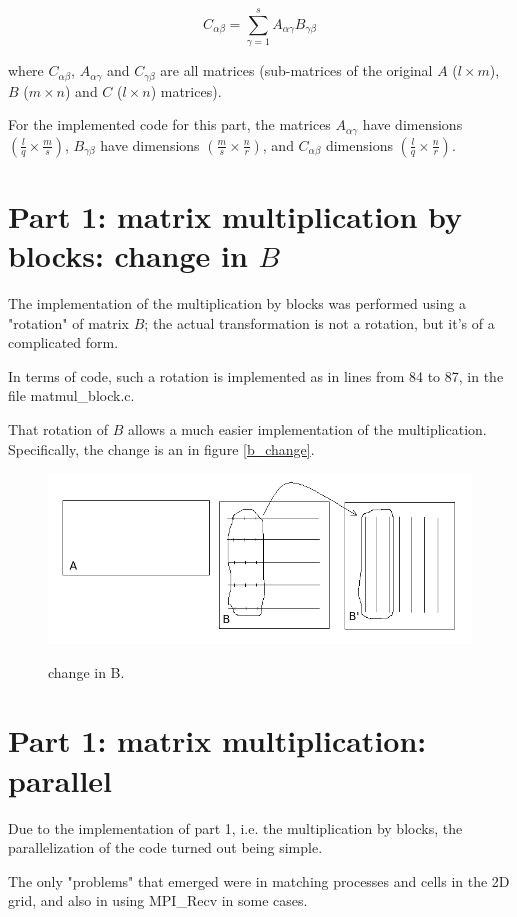 \documentclass[paper=a4, fontsize=11pt]{scrartcl} %
\numberwithin{equation}{section} %
\numberwithin{figure}{section} %
\numberwithin{table}{section} %
\begin{document}
\begin{equation}
C_{\alpha \beta} = \sum_{\gamma = 1}^{s} A_{\alpha \gamma} B_{\gamma \beta}
\label{eq:poisson1}
\end{equation}

where $C_{\alpha \beta}$, $A_{\alpha \gamma}$ and $C_{\gamma \beta}$ are all matrices (sub-matrices of the original $A$ ($l \times m$), $B$ ($m \times n$) and $C$ ($l \times n$) matrices).

For the implemented code for this part, the matrices $A_{\alpha \gamma}$ have dimensions $\left( \frac{l}{q} \times \frac{m}{s} \right)$, $B_{\gamma \beta}$ have dimensions $\left( \frac{m}{s} \times \frac{n}{r} \right)$, and $C_{\alpha \beta}$ dimensions $\left( \frac{l}{q} \times \frac{n}{r} \right)$.




\section{Part 1: matrix multiplication by blocks: change in $B$}

The implementation of the multiplication by blocks was performed using a "rotation" of matrix $B$; the actual transformation is not a rotation, but it's of a complicated form.

In terms of code, such a rotation is implemented as in lines from 84 to 87, in the file matmul\_block.c.

That rotation of $B$ allows a much easier implementation of the multiplication. Specifically, the change is an in figure \ref{b_change}.

\begin{figure}[h]
\includegraphics[width=14cm]{B_change.png}
\centering
\label{fig:b_change}
\caption{change in B.}
\end{figure}

\section{Part 1: matrix multiplication: parallel}

Due to the implementation of part 1, i.e. the multiplication by blocks, the parallelization of the code turned out being simple.

The only "problems" that emerged were in matching processes and cells in the 2D grid, and also in using MPI\_Recv in some cases.
\end{document}
